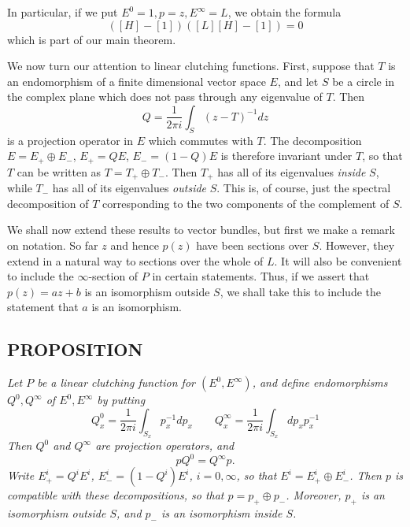 In particular, if we put $E^0 = 1, p = z, E^\infty = L$, we obtain the formula
\begin{equation*}
    ([H] - [1])([L][H] - [1]) = 0
\end{equation*}
which is part of our main theorem. \par 

We now turn our attention to linear clutching functions. First, suppose that $T$ is an endomorphism of a finite dimensional vector space $E$, and let $S$ be a circle in the complex plane which does not pass through any eigenvalue of $T$. Then
\begin{equation*}
    Q = \frac{1}{2 \pi i} \int_S (z - T)^{-1} dz
\end{equation*}
is a projection operator in $E$ which commutes with $T$. The decomposition $E = E_+ \oplus E_-$, $E_+ = QE$, $E_- = (1 - Q)E$ is therefore invariant under $T$, so that $T$ can be written as $T = T_+ \oplus T_-$. Then $T_+$ has all of its eigenvalues \textit{inside} $S$, while $T_-$ has all of its eigenvalues \textit{outside} $S$. This is, of course, just the spectral decomposition of $T$ corresponding to the two components of the complement of $S$. \par 

We shall now extend these results to vector bundles, but first we make a remark on notation. So far $z$ and hence $p(z)$ have been sections over $S$. However, they extend in a natural way to sections over the whole of $L$. It will also be convenient to include the $\infty$-section of $P$ in certain statements. Thus, if we assert that $p(z) = az + b$ is an isomorphism outside $S$, we shall take this to include the statement that $a$ is an isomorphism. \par 

\subsection{PROPOSITION}\label{pro:2.2.8} \textit{Let $P$ be a linear clutching
function for $(E^0, E^\infty)$, and define endomorphisms $Q^0, Q^\infty$ of $E^0, E^\infty$ by putting}
\begin{equation*}
    Q^0_x = \frac{1}{2 \pi i} \int_{S_x} p_x^{-1} dp_x \qquad Q^\infty_x = \frac{1}{2 \pi i} \int_{S_x} dp_x p_x^{-1}
\end{equation*}
\textit{Then $Q^0$ and $Q^\infty$ are projection operators, and}
\begin{equation*}
    pQ^0 = Q^\infty p .
\end{equation*}
\textit{Write $E^i_+ = Q^i E^i$, $E^i_- = (1 - Q^i) E^i$, $i = 0, \infty$, so that $E^i = E^i_+ \oplus E^i_-$. Then $p$ is compatible with these decompositions, so that $p = p_+ \oplus p_-$. Moreover, $p_+$ is an isomorphism outside $S$, and $p_-$ is an isomorphism inside $S$.}

